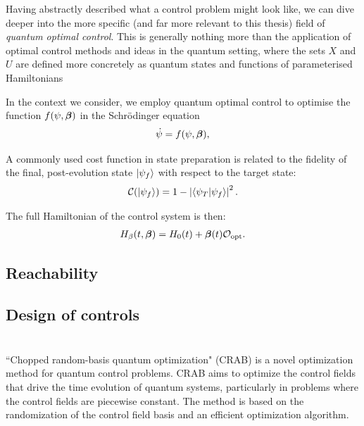 Having abstractly described what a control problem might look like, we can dive deeper into the more specific (and far more relevant to this thesis) field of \emph{quantum optimal control}. This is generally nothing more than the application of optimal control methods and ideas in the quantum setting, where the sets $X$ and $U$ are defined more concretely as quantum states and functions of parameterised Hamiltonians 

In the context we consider,  we employ quantum optimal control to optimise the function $f(\psi,\boldsymbol{\beta})$ in the Schr\"odinger equation
\begin{equation}
\dot{\psi} = f(\psi,\boldsymbol{\beta}),
\label{eq:control_schroedinger}
\end{equation}

A commonly used cost function in state preparation is related  to the fidelity of the final, post-evolution state $\ket{\psi_f}$ with respect to the target state:
\begin{align} \label{eq:lossfunc}
    \mathcal{C}(\ket{\psi_f}) = 1 - \left|\braket{\psi_T}{\psi_f}\right|^2.
\end{align}

The full Hamiltonian of the control system is then:
\begin{align} \label{eq:h_optimal_control}
    H_{\beta}(t,\boldsymbol{\beta})  = H_0(t) + \boldsymbol{\beta}(t)\mathcal{O}_{\rm opt}.
\end{align}

\subsection{Reachability}

\subsection{Design of controls}

\section{}

``Chopped random-basis quantum optimization" (CRAB) is a novel optimization method for quantum control problems. CRAB aims to optimize the control fields that drive the time evolution of quantum systems, particularly in problems where the control fields are piecewise constant. The method is based on the randomization of the control field basis and an efficient optimization algorithm.

